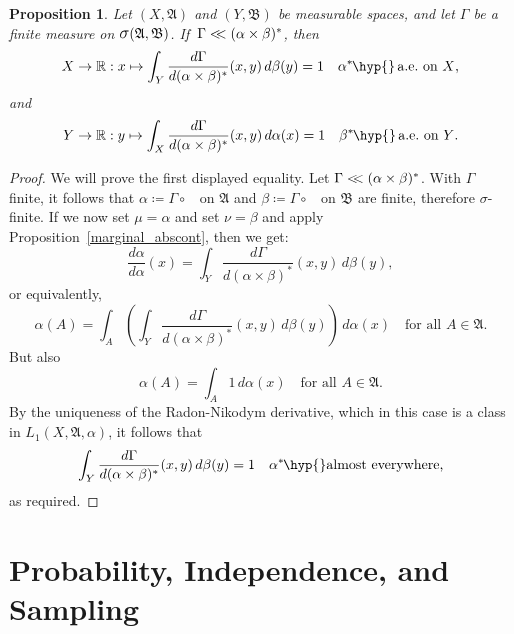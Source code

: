 \documentclass[
twoside=true,
paper=letter,
fontsize=9pt,
pagesize=auto,
leqno,
openany,
headsepline,
overfullrule,
]{scrbook}
\theoremstyle{plain}
\theoremstyle{plain}
\newtheorem{prop}[thm]{Proposition}
\theoremstyle{definition}
\theoremstyle{bfnoteitalic}
\theoremstyle{bfnoteroman}
\newcommand{\sigalg}[1]{\mathfrak{#1}}
\newcommand{\definedby}{\coloneqq}
\newcommand{\sagb}{\mathop{\hbox{\large{$\sigma$}}}\nolimits}
\newcommand{\textsigma}{\hbox{\large{$\sigma$}}\kern-1pt}
\newcommand{\preimage}[1]{\mathop{#1^{\leftarrow}}}
\newcommand{\R}{\mathbb{R}}
\newcommand{\sigmaalgebra}{\sigalg{A}}
\newcommand{\sigmaalgebraii}{\sigalg{B}}
\newcommand{\productsig}[2]{\sagb(#1,#2)}
\newcommand{\kernast}{\ast\kern-1pt}
\newcommand{\measurespace}{X}
\newcommand{\measurespaceii}{Y}
\newcommand{\mspaceelt}{x}
\newcommand{\mspaceeltii}{y}
\newcommand{\abscont}{\mathrel{< \kern-3.5pt <}}
\newcommand{\measmu}{\mu}
\newcommand{\measnu}{\nu}
\newcommand{\seti}{A}
\newcommand{\projectionone}{\pi_1}
\newcommand{\projectiontwo}{\pi_2}
\newcommand{\measonprod}{\Gamma}%
\newcommand{\marginalone}{\alpha}%
\newcommand{\marginaltwo}{\beta}%
\begin{document}
\begin{prop}\label{almost_a_measure}
Let
$(\measurespace, \sigmaalgebra)$
and
$(\measurespaceii, \sigmaalgebraii)$
be measurable spaces, and let  $\measonprod$ be a finite measure on
$\productsig{\sigmaalgebra}{\sigmaalgebraii}$.
If\, $\measonprod \abscont (\marginalone\times\marginaltwo)^*$, then
\[
\measurespace\to\R
:\mspaceelt\mapsto
\int_\measurespaceii \dfrac{d\measonprod}{d(\marginalone\times\marginaltwo)^*}
(\mspaceelt,\mspaceeltii)
\,d\marginaltwo(\mspaceeltii)
=
1
\quad
\text{$\marginalone^\kernast$\hyp{}\,a.e.\ on $\measurespace$,}
\]
and
\[
\measurespaceii\to\R:\mspaceeltii\mapsto
\int_\measurespace \dfrac{d\measonprod}{d(\marginalone\times\marginaltwo)^*}
(\mspaceelt,\mspaceeltii)
\,d\marginalone(\mspaceelt)
=
1
\quad
\text{$\marginaltwo^\kernast$\hyp{}\,a.e.\ on $\measurespaceii$.}
\]
\end{prop}
\begin{proof}
We will prove the first displayed equality.
Let $\measonprod\abscont(\marginalone\times\marginaltwo)^*$.
With $\measonprod$ finite, it follows that
$\marginalone\definedby
\measonprod \circ \preimage{\projectionone}$
on $\sigmaalgebra$
and
$\marginaltwo\definedby
\measonprod \circ \preimage{\projectiontwo}$
on $\sigmaalgebraii$
are finite, therefore \textsigma\hyp{}finite.
If we now set
$\measmu = \marginalone$
and set
$\measnu=\marginaltwo$ and apply Proposition~\ref{marginal_abscont}, then we get:
\[
\frac{d \marginalone}{d\marginalone}(\mspaceelt)
=
\int_{\measurespaceii}
\frac{d\measonprod}{d(\marginalone\times\marginaltwo)^*}
(\mspaceelt,\mspaceeltii)
\,d\marginaltwo(\mspaceeltii),
\]
or equivalently,
\[
\marginalone(\seti)
=
\int_\seti
\left(
\int_{\measurespaceii}
\frac{d\measonprod}{d(\marginalone\times\marginaltwo)^*}
(\mspaceelt,\mspaceeltii)
\,d\marginaltwo(\mspaceeltii)
\right)
\,d\marginalone(\mspaceelt)\quad\text{for all $\seti\in\sigmaalgebra$.}
\]
But also
\[
\marginalone(\seti)
=
\int_\seti
1
\,d\marginalone(\mspaceelt)\quad\text{for all $\seti\in\sigmaalgebra$.}
\]
By the uniqueness of the Radon-Nikodym derivative, which in this case is a class in
$L_1(\measurespace, \sigmaalgebra,\marginalone)$, it follows that
\[
\int_{\measurespaceii}
\frac{d\measonprod}{d(\marginalone\times\marginaltwo)^*}
(\mspaceelt,\mspaceeltii)
\,d\marginaltwo(\mspaceeltii)
= 1
\quad
\text{$\marginalone^\kernast$\hyp{}almost everywhere,}
\]
as required.
\end{proof}


\chapter{Probability, Independence, and Sampling}
\end{document}
